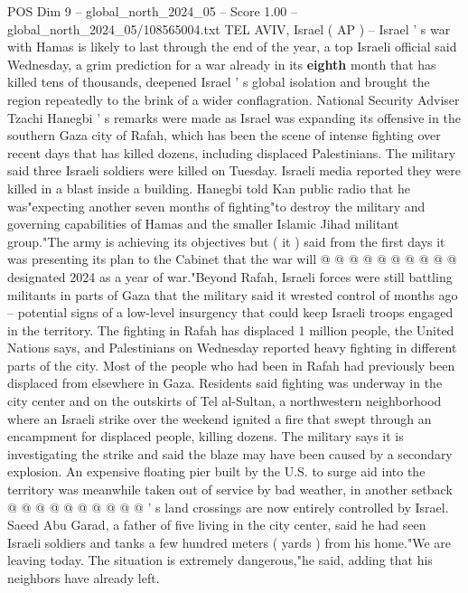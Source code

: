 \begin{textsample}{POS Dim 9 – global\_north\_2024\_05 – Score 1.00 – global\_north\_2024\_05/108565004.txt}  \label{ex:f9_pos_300}
TEL AVIV, Israel ( AP ) -- Israel ' s war with Hamas is likely to last through the end of the year, a top Israeli official said Wednesday, a grim prediction for a war already in its \textbf{eighth} month that has killed tens of thousands, deepened Israel ' s global isolation and brought the region repeatedly to the brink of a wider conflagration.
National Security Adviser Tzachi Hanegbi ' s remarks were made as Israel was expanding its offensive in the southern Gaza city of Rafah, which has been the scene of intense fighting over recent days that has killed dozens, including displaced Palestinians.
The military said three Israeli soldiers were killed on Tuesday.
Israeli media reported they were killed in a blast inside a building.
Hanegbi told Kan public radio that he was"expecting another seven months of fighting"to destroy the military and governing capabilities of Hamas and the smaller Islamic Jihad militant group."The army is achieving its objectives but ( it ) said from the first days it was presenting its plan to the Cabinet that the war will @ @ @ @ @ @ @ @ @ @ designated 2024 as a year of war."Beyond Rafah, Israeli forces were still battling militants in parts of Gaza that the military said it wrested control of months ago -- potential signs of a low-level insurgency that could keep Israeli troops engaged in the territory.
The fighting in Rafah has displaced 1 million people, the United Nations says, and Palestinians on Wednesday reported heavy fighting in different parts of the city.
Most of the people who had been in Rafah had previously been displaced from elsewhere in Gaza.
Residents said fighting was underway in the city center and on the outskirts of Tel al-Sultan, a northwestern neighborhood where an Israeli strike over the weekend ignited a fire that swept through an encampment for displaced people, killing dozens.
The military says it is investigating the strike and said the blaze may have been caused by a secondary explosion.
An expensive floating pier built by the U.S. to surge aid into the territory was meanwhile taken out of service by bad weather, in another setback @ @ @ @ @ @ @ @ @ @ ' s land crossings are now entirely controlled by Israel.
Saeed Abu Garad, a father of five living in the city center, said he had seen Israeli soldiers and tanks a few hundred meters ( yards ) from his home."We are leaving today.
The situation is extremely dangerous,"he said, adding that his neighbors have already left.

\end{textsample}
